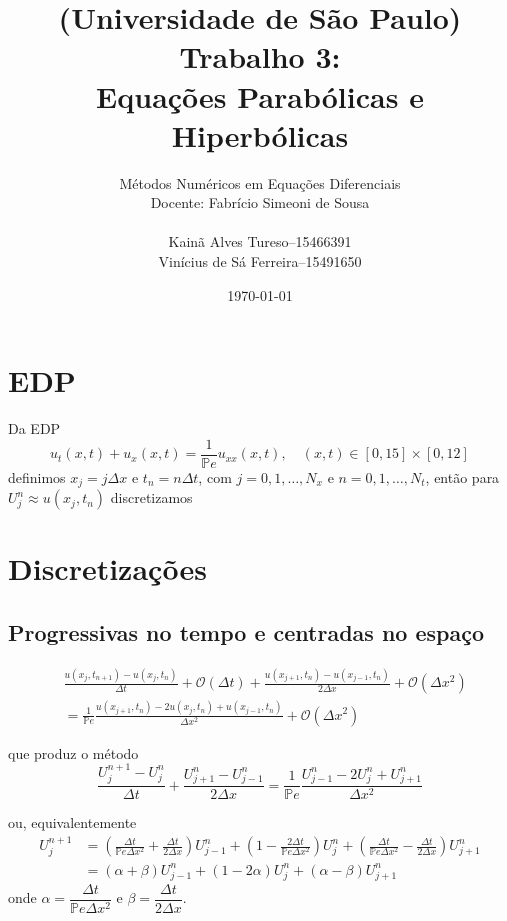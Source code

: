 \documentclass[12pt, a4paper]{article}
\title{(Universidade de São Paulo)\\
Trabalho 3:\\Equações Parabólicas e Hiperbólicas}
\author{Métodos Numéricos em Equações Diferenciais\\
Docente: Fabrício Simeoni de Sousa\\[.2cm]
\begin{tabular}{r@{\ }c@{\ }l}
    Kainã Alves Tureso      &-- &15466391\\
    Vinícius de Sá Ferreira &-- &15491650
\end{tabular}}
\date{\today}
\newcommand{\bb}[1]{\mathbb{#1}}
\newcommand{\D}[1]{\Delta#1}
\renewcommand{\O}[1]{\mathcal{O} (#1)}
\begin{document}
    \maketitle

    \section{EDP}
    Da EDP
    \begin{equation}
        u_t(x,t) + u_x(x,t) = \frac{1}{\bb{P}e} u_{xx}(x,t), \quad (x,t) \in [0,15] \times [0,12]
    \end{equation}
    definimos $x_j = j\D{x}$ e $t_n = n\D{t}$, com $j = 0,1,\ldots,N_x$ e $n = 0,1,\ldots,N_t$, então para $U_j^n \approx u(x_j,t_n)$ discretizamos

    \section{Discretizações}
    \subsection{Progressivas no tempo e centradas no espaço}
    \begin{equation}
        \begin{split}
            &\frac{u(x_j,t_{n+1})-u(x_j,t_n)}{\D{t}} + \O{\D{t}} + \frac{u(x_{j+1},t_n)-u(x_{j-1},t_n)}{2\D{x}} + \O{\D{x}^2}
            \\&= \frac{1}{\bb{P}e} \frac{u(x_{j+1},t_n)-2u(x_j,t_n)+u(x_{j-1},t_n)}{\D{x}^2} + \O{\D{x}^2}
        \end{split}
    \end{equation}

    que produz o método
    \begin{equation}
        \frac{U_j^{n+1}-U_j^n}{\D{t}} + \frac{U_{j+1}^n-U_{j-1}^n}{2\D{x}} = \frac{1}{\bb{P}e} \frac{U_{j-1}^n-2U_j^n+U_{j+1}^n}{\D{x}^2}
    \end{equation}

    ou, equivalentemente
    \begin{equation}
        \begin{split}
            U_j^{n+1} &= \left(\frac{\D{t}}{\bb{P}e\D{x^2}}+\frac{\D{t}}{2\D{x}}\right)U_{j-1}^n + \left(1-\frac{2\D{t}}{\bb{P}e\D{x^2}}\right)U_j^n + \left(\frac{\D{t}}{\bb{P}e\D{x^2}}-\frac{\D{t}}{2\D{x}}\right)U_{j+1}^n\\[.2cm]
            &= (\alpha+\beta)U_{j-1}^n + (1-2\alpha)U_j^n + (\alpha-\beta)U_{j+1}^n
        \end{split}
    \end{equation}
    onde $\alpha = \dfrac{\D{t}}{\bb{P}e\D{x^2}}$ e $\beta = \dfrac{\D{t}}{2\D{x}}$.
\end{document}
